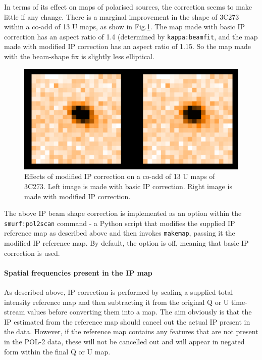 \documentclass[twoside,11pt]{starlink}
\begin{document}
\begin{itemize}
In terms of its effect on maps of polarised sources, the correction seems
to make little if any change. There is a marginal improvement in the
shape of 3C273 within a co-add of 13 U maps, as show in Fig.\ref{fig:ip5}.
The map made with basic IP correction has an aspect ratio of 1.4
(determined by \texttt{kappa:beamfit}, and the map made with modified IP
correction has an aspect ratio of 1.15. So the map made with the beam-shape
fix is slightly  less elliptical.

\begin{figure}
\includegraphics[width=\columnwidth]{ip5}
\caption{Effects of modified IP correction on a co-add of 13 U maps of
3C273. Left image is made with basic IP correction. Right image is made
with modified IP correction.}
\label{fig:ip5}
\end{figure}

\end{itemize}

The above IP beam shape correction is implemented as an option within the
\texttt{smurf:pol2scan} command - a Python script that modifies the
supplied IP reference map as described above and then invokes \texttt{makemap},
passing it the modified IP reference map. By default, the option is off,
meaning that basic IP correction is used.

\paragraph{Spatial frequencies present in the IP map}
As described above, IP correction is performed by scaling a supplied
total intensity reference map and then subtracting it from the original Q
or U time-stream values before converting them into a map. The aim
obviously is that the IP estimated from the reference map should cancel
out the actual IP present in the data. However, if the reference map
contains any features that are not present in the POL-2 data, these will
not be cancelled out and will appear in negated form within the final Q
or U map.
\end{document}
